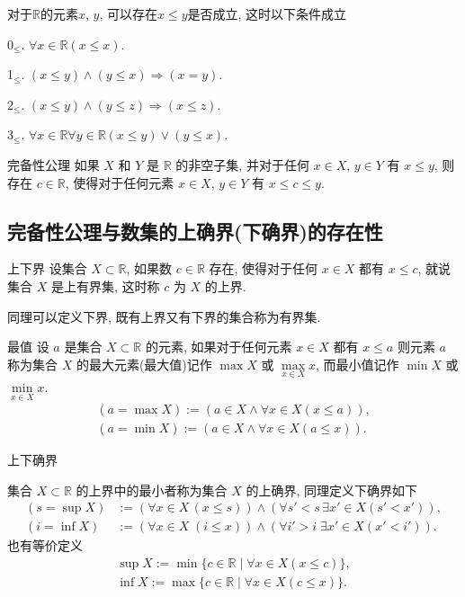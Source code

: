 \documentclass[cn,toc=twocol]{elegantbook}
\newcommand{\R}{\mathbb{R}}
\begin{document}
\begin{axiom}[序公理]
	对于$\R$的元素$x$, $y$, 可以存在$x\le y$是否成立, 这时以下条件成立
	
	0$_\le$. $\forall x\in\R (x\le x)$.
	
	1$_\le$. $(x\le y)\land(y\le x)\Rightarrow(x=y)$.
	
	2$_\le$. $(x\le y)\land(y\le z)\Rightarrow(x\le z)$.
	
	3$_\le$. $\forall x\in\R\forall y\in\R(x\le y)\lor(y\le x)$.

\end{axiom}
	
\begin{axiom}{完备性公理}
	如果 $X$ 和 $Y$ 是 $\R$ 的非空子集, 并对于任何 $x\in X$, $y\in Y$ 有 $x \le y$, 则存在 $c\in\R$, 使得对于任何元素 $x\in X$, $y\in Y$ 有 $x\le c\le y$.
\end{axiom}


\subsection{完备性公理与数集的上确界(下确界)的存在性}

\begin{definition}{上下界}
设集合 $X\subset \R$, 如果数 $c\in\R$ 存在, 使得对于任何 $x\in X$ 都有 $x\le c$, 就说集合 $X$ 是上有界集, 这时称 $c$ 为 $X$ 的上界.

同理可以定义下界, 既有上界又有下界的集合称为有界集.
\end{definition}

\begin{definition}{最值}
设 $a$ 是集合 $X\subset\R$ 的元素, 如果对于任何元素 $x\in X$ 都有 $x\le a$ 则元素 $a$ 称为集合 $X$ 的最大元素(最大值)记作 $\max X$ 或 $\max\limits_{x\in X} x$, 而最小值记作 $\min X$ 或 $\min\limits_{x\in X} x$.
\[
\begin{aligned}
	(a = \max X) := (a\in X \land \forall x \in X (x\le a)),\\
	(a = \min X) := (a\in X \land \forall x \in X (a\le x)).
\end{aligned}
\]
\end{definition}

\begin{definition}{上下确界}

集合 $X\subset\R$ 的上界中的最小者称为集合 $X$ 的上确界, 同理定义下确界如下
\[
\begin{aligned}
	(s = \sup X) &:= (\forall x\in X\, (x\le s))\land (\forall s' < s\,  \exists x' \in X (s'< x')),\\
	(i = \inf X) &:= (\forall x\in X\;(i\le x))\land (\forall i' > i\; \exists x' \in X (x'< i')).
\end{aligned}
\]
也有等价定义
\[
\begin{aligned}
	\sup X  := \min\{c\in\R\mid\forall x\in X(x\le c)\},\\
	\inf X  := \max\{c\in\R\mid\forall x\in X(c\le x)\}.
\end{aligned}
\]
\end{definition}
\end{document}
